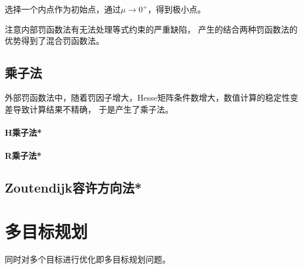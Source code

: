 选择一个内点作为初始点，通过$\mu\to 0^+$，得到极小点。

注意内部罚函数法有无法处理等式约束的严重缺陷，
产生的结合两种罚函数法的优势得到了混合罚函数法。

\subsection{乘子法}
外部罚函数法中，随着罚因子增大，Hesse矩阵条件数增大，数值计算的稳定性变差导致计算结果不精确，
于是产生了乘子法。

\paragraph{H乘子法*}
\paragraph{R乘子法*}

\subsection{Zoutendijk容许方向法*}

\section{多目标规划}
同时对多个目标进行优化即多目标规划问题。

